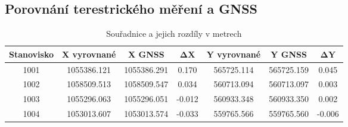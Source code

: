 \subsection{Porovnání terestrického měření a GNSS}

\begin{table}[H]
\centering
\caption{Souřadnice a jejich rozdíly v metrech}
\begin{tabular}{|c||c|c|c||c|c|c|}
\hline
\textbf{Stanovisko} & \textbf{X vyrovnané} & \textbf{X GNSS} & $\mathbf{\Delta X}$ & \textbf{Y vyrovnané} & \textbf{Y GNSS} & $\mathbf{\Delta Y}$ \\
\hline\hline
1001 & 1055386.121 & 1055386.291 & 0.170 & 565725.114 & 565725.159 & 0.045 \\ \hline
1002 & 1058509.513 & 1058509.547 & 0.034 & 560713.094 & 560713.097 & 0.003 \\ \hline
1003 & 1055296.063 & 1055296.051 & -0.012 & 560933.348 & 560933.350 & 0.002 \\ \hline
1004 & 1053013.607 & 1053013.574 & -0.033 & 559765.566 & 559765.560 & -0.006 \\
\hline
\end{tabular}
\end{table}
